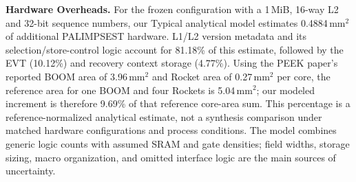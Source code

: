 \noindent\textbf{Hardware Overheads.} For the frozen configuration with a 1\,MiB, 16-way L2 and 32-bit sequence numbers, our Typical analytical model estimates 0.4884\,mm$^2$ of additional PALIMPSEST hardware. L1/L2 version metadata and its selection/store-control logic account for 81.18\% of this estimate, followed by the EVT (10.12\%) and recovery context storage (4.77\%). Using the PEEK paper's reported BOOM area of 3.96\,mm$^2$ and Rocket area of 0.27\,mm$^2$ per core, the reference area for one BOOM and four Rockets is 5.04\,mm$^2$; our modeled increment is therefore 9.69\% of that reference core-area sum. This percentage is a reference-normalized analytical estimate, not a synthesis comparison under matched hardware configurations and process conditions. The model combines generic logic counts with assumed SRAM and gate densities; field widths, storage sizing, macro organization, and omitted interface logic are the main sources of uncertainty.
